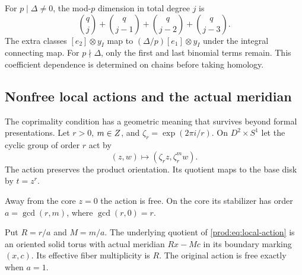 For $p\mid\Delta\ne0$, the mod-$p$ dimension in total degree $j$ is
\[
 \binom qj+\binom q{j-1}+\binom q{j-2}+\binom q{j-3}.
\]
The extra classes $[e_2]\otimes y_I$ map to
$(\Delta/p)[e_1]\otimes y_I$ under the integral connecting map.
For $p\nmid\Delta$, only the first and last binomial terms remain.
This coefficient dependence is determined on chains before taking homology.

\subsection{Nonfree local actions and the actual meridian}

The coprimality condition has a geometric meaning that survives beyond
formal presentations.  Let $r>0$, $m\in Z$, and
$\zeta_r=\exp(2\pi i/r)$.  On $D^2\times S^1$ let the cyclic group
of order $r$ act by
\begin{equation}\label{prod:eq:local-action}
                        (z,w)\longmapsto(\zeta_rz,\zeta_r^m w).
\end{equation}
The action preserves the product orientation.  Its quotient maps to the
base disk by $t=z^r$.

Away from the core $z=0$ the action is free.
On the core its stabilizer has order $a=\gcd(r,m)$, where
$\gcd(r,0)=r$.

\begin{proposition}\label{prod:prop:local-reduction}
Put $R=r/a$ and $M=m/a$.  The underlying quotient of
\eqref{prod:eq:local-action} is an oriented solid torus with actual meridian
$Rx-Mc$ in its boundary marking $(x,c)$.
Its effective fiber multiplicity is $R$.
The original action is free exactly when $a=1$.
\end{proposition}

